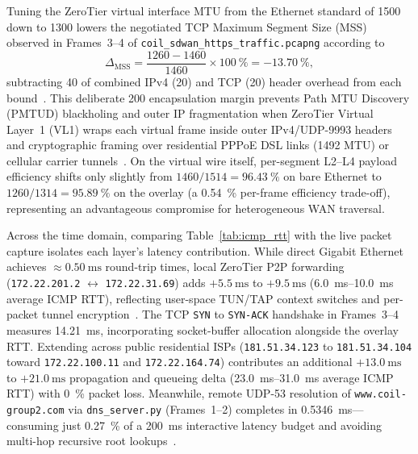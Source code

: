 Tuning the ZeroTier virtual interface MTU from the Ethernet standard of \qty{1500}{\byte} down to \qty{1300}{\byte} lowers the negotiated TCP Maximum Segment Size (MSS) observed in Frames~3--4 of \nolinkurl{coil_sdwan_https_traffic.pcapng} according to
\begin{equation}
\Delta_{\text{MSS}} = \frac{1260 - 1460}{1460} \times \qty{100}{\percent} = -\qty{13.70}{\percent},
\label{eq:mss_delta}
\end{equation}
subtracting \qty{40}{\byte} of combined IPv4 (\qty{20}{\byte}) and TCP (\qty{20}{\byte}) header overhead from each bound~\cite{rfc9293}. This deliberate \qty{200}{\byte} encapsulation margin prevents Path MTU Discovery (PMTUD) blackholing and outer IP fragmentation when ZeroTier Virtual Layer~1 (VL1) wraps each virtual frame inside outer IPv4/UDP-9993 headers and cryptographic framing over residential PPPoE DSL links (\qty{1492}{\byte} MTU) or cellular carrier tunnels~\cite{kozierok2005,zerotier2024}. On the virtual wire itself, per-segment L2--L4 payload efficiency shifts only slightly from $1460/1514 = \qty{96.43}{\percent}$ on bare Ethernet to $1260/1314 = \qty{95.89}{\percent}$ on the overlay (a \qty{0.54}{\percent} per-frame efficiency trade-off), representing an advantageous compromise for heterogeneous WAN traversal.

Across the time domain, comparing Table~\ref{tab:icmp_rtt} with the live packet capture isolates each layer's latency contribution. While direct Gigabit Ethernet achieves $\approx \qty{0.50}{\milli\second}$ round-trip times, local ZeroTier P2P forwarding (\texttt{172.22.201.2} $\leftrightarrow$ \texttt{172.22.31.69}) adds $+\qty{5.5}{\milli\second}$ to $+\qty{9.5}{\milli\second}$ (\qty{6.0}{\milli\second}--\qty{10.0}{\milli\second} average ICMP RTT), reflecting user-space TUN/TAP context switches and per-packet tunnel encryption~\cite{zerotier2024}. The TCP \texttt{SYN} to \texttt{SYN-ACK} handshake in Frames~3--4 measures \qty{14.21}{\milli\second}, incorporating socket-buffer allocation alongside the overlay RTT. Extending across public residential ISPs (\texttt{181.51.34.123} to \texttt{181.51.34.104} toward \nolinkurl{172.22.100.11} and \nolinkurl{172.22.164.74}) contributes an additional $+\qty{13.0}{\milli\second}$ to $+\qty{21.0}{\milli\second}$ propagation and queueing delta (\qty{23.0}{\milli\second}--\qty{31.0}{\milli\second} average ICMP RTT) with \qty{0}{\percent} packet loss. Meanwhile, remote UDP-53 resolution of \nolinkurl{www.coil-group2.com} via \texttt{dns\_server.py} (Frames~1--2) completes in \qty{0.5346}{\milli\second}---consuming just \qty{0.27}{\percent} of a \qty{200}{\milli\second} interactive latency budget and avoiding multi-hop recursive root lookups~\cite{forouzan2013,kurose2017}.

